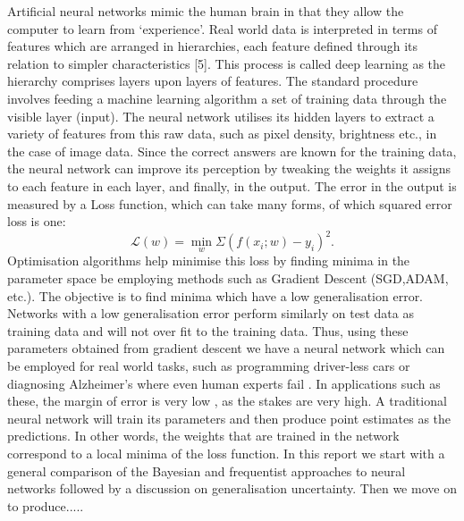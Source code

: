 \documentclass[review]{siamart190516}
\begin{document}
Artificial neural networks mimic the human brain in that they allow the computer to learn from ‘experience’. Real world data is interpreted in terms of features which are arranged in hierarchies, each feature defined through its relation to simpler characteristics [5]. This process is called deep learning as the hierarchy comprises layers upon layers of features.
\newline 
The standard procedure involves feeding a machine learning algorithm a set of training data through the visible layer (input). The neural network utilises its hidden layers to extract a variety of features from this raw data, such as pixel density, brightness etc., in the case of image data. Since the correct answers are known for the training data, the neural network can improve its perception by tweaking the weights it assigns to each feature in each layer, and finally, in the output. The error in the output is measured by a Loss function, which can take many forms, of which squared error loss is one:
\begin{equation} \label{eq:loss}
\mathcal{L}(w) = \min_{w} \Sigma (f (x_i; w) - y_i)^2.
\end{equation}
Optimisation algorithms help minimise this loss by finding minima in the parameter space be employing methods such as Gradient Descent (SGD,ADAM, etc.). The objective is to find minima which have a low generalisation error. Networks with a low generalisation error perform similarly on test data as training data and will not over fit to the training data.
Thus, using these parameters obtained from gradient descent we have a neural network which can be employed for real world tasks, such as programming driver-less cars or diagnosing Alzheimer's where even human experts fail \cite{OZSAHIN2020183}. 
\newline 
In applications such as these, the margin of error is very low \cite{indrayan2008medical}, as the stakes are very high. A traditional neural network will train its parameters and then produce point estimates as the predictions. In other words, the weights that are trained in the network correspond to a local minima of the loss function.
\newline 
In this report we start with a general comparison of the Bayesian and frequentist approaches to neural networks followed by a discussion on generalisation uncertainty. Then we move on to produce.....
\end{document}
